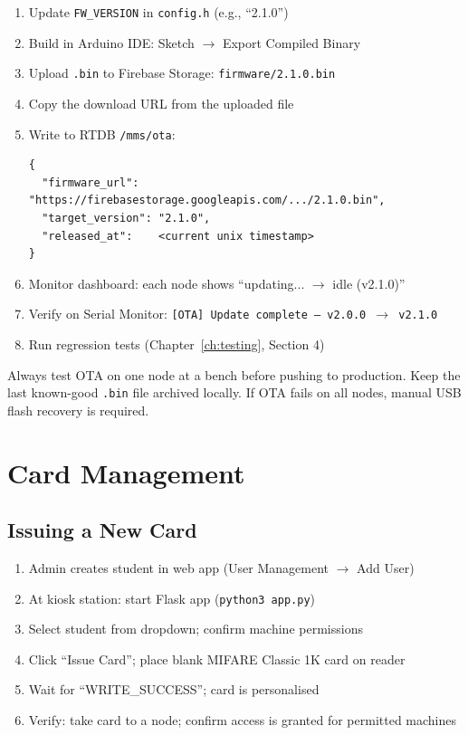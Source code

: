 \begin{enumerate}[leftmargin=1.5em]
    \item Update \texttt{FW\_VERSION} in \texttt{config.h} (e.g., ``2.1.0'')
    \item Build in Arduino IDE: Sketch $\rightarrow$ Export Compiled Binary
    \item Upload \texttt{.bin} to Firebase Storage: \texttt{firmware/2.1.0.bin}
    \item Copy the download URL from the uploaded file
    \item Write to RTDB \texttt{/mms/ota}:
\begin{lstlisting}[style=jsonlstyle]
{
  "firmware_url":   "https://firebasestorage.googleapis.com/.../2.1.0.bin",
  "target_version": "2.1.0",
  "released_at":    <current unix timestamp>
}
\end{lstlisting}
    \item Monitor dashboard: each node shows ``updating... $\rightarrow$ idle (v2.1.0)''
    \item Verify on Serial Monitor: \texttt{[OTA] Update complete — v2.0.0 $\rightarrow$ v2.1.0}
    \item Run regression tests (Chapter~\ref{ch:testing}, Section 4)
\end{enumerate}

\begin{warnbox}
Always test OTA on one node at a bench before pushing to production. Keep the last known-good \texttt{.bin} file archived locally. If OTA fails on all nodes, manual USB flash recovery is required.
\end{warnbox}

\section{Card Management}

\subsection{Issuing a New Card}
\begin{enumerate}[leftmargin=1.5em]
    \item Admin creates student in web app (User Management $\rightarrow$ Add User)
    \item At kiosk station: start Flask app (\texttt{python3 app.py})
    \item Select student from dropdown; confirm machine permissions
    \item Click ``Issue Card''; place blank MIFARE Classic 1K card on reader
    \item Wait for ``WRITE\_SUCCESS''; card is personalised
    \item Verify: take card to a node; confirm access is granted for permitted machines
\end{enumerate}

